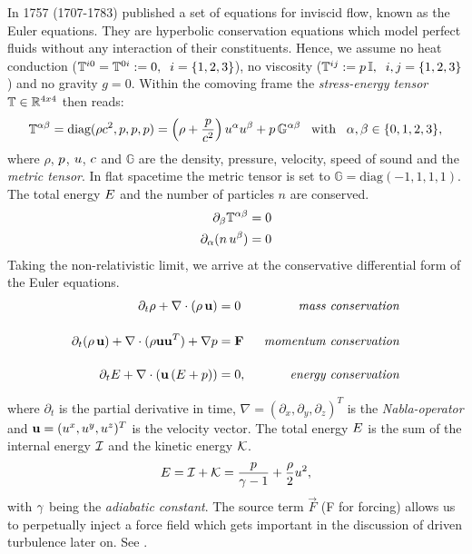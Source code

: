 In 1757  (1707-1783) published a set of equations for
inviscid flow, known as the Euler equations. They are hyperbolic
conservation equations which model perfect fluids without any interaction of their
constituents.  Hence, we assume no
heat conduction ($\mathbb{T}^{i0} = \mathbb{T}^{0i} := 0, \;\;i = \{1,2,3\}$), no viscosity
($\mathbb{T}^{ij} := p\,\mathbb{I}, \;\;i,j = \{1,2,3\}$) and no gravity $g = 0$. 
Within the comoving frame the
\emph{stress-energy tensor} $\mathbb{T} \in \mathbb{R}^{4x4}$ then reads:
\begin{equation}
\mathbb{T}^{\alpha\beta} = \text{diag}(\rho c^2,p,p,p) = \left(\rho + \frac{p}{c^2}\right) u^\alpha u^\beta + p\,\mathbb{G}^{\alpha\beta} \;\;\; \text{with}  \;\;\; \alpha, \beta \in \{0,1,2,3\},
\end{equation}
where $\rho$, $p$, $u$, $c$ and $\mathbb{G}$ are the
density, pressure, velocity, speed of sound and the \emph{metric tensor}.
In flat spacetime the metric tensor is set to $\mathbb{G} =
\text{diag}(-1,1,1,1)$. The total energy $E$ and the number of particles $n$ are
conserved.
\begin{align}
\partial_\beta \mathbb{T}^{\alpha\beta}  &= 0\\
\partial_\alpha (n\,u^\beta) &= 0
\end{align}
Taking the non-relativistic limit, we arrive at the conservative differential
form of the Euler equations.
\begin{align}
\label{eqn:comp-euler-conservative}
\partial_t\rho + \nabla \cdot (\rho\,\mathbf{u})   &=  0 \;\; &\text{\emph{mass conservation}}\\[0.4cm]
\partial_t(\rho\,\mathbf{u}) + \nabla\cdot(\rho\mathbf{u}\mathbf{u}^T) + \nabla p &= \mathbf{F}  \;\;&\text{\emph{momentum conservation}}\\[0.4cm]
\partial_t E + \nabla \cdot (\mathbf{u}\,(E + p)) &=  0,\;\;&\text{\emph{energy conservation}}
\end{align}

where $\partial_t$ is the partial derivative in time, $\nabla =
(\partial_x,\partial_y,\partial_z)^T$ is the \emph{Nabla-operator} and
$\mathbf{u} = (u^x,u^y,u^z)^T$ is the velocity vector. The total energy $E$ is
the sum of the internal energy $\mathcal{I}$ and the kinetic energy $\mathcal{K}$.
\begin{equation}
E = \mathcal{I} + \mathcal{K} = \frac{p}{\gamma -1} + \frac{\rho}{2}u^2,
\end{equation}
with $\gamma$ being the \emph{adiabatic constant}.
The source term $\vec{F}$ (F for forcing) allows us to perpetually inject a
force field which gets important in the discussion of driven turbulence later
on. See .

